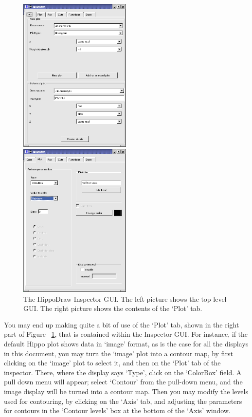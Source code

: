 \documentclass[10pt]{article}
\begin{document}
\begin{figure}
  \centering
  \begin{minipage}[c]{0.5\textwidth}
     \centering \includegraphics[width=2.2in]{FiguresAndDiagrams/inspector_top}
  \end{minipage}%
  \begin{minipage}[c]{0.5\textwidth}
     \centering \includegraphics[width=2.2in]{FiguresAndDiagrams/inspector_plot}
  \end{minipage}
  \caption {The HippoDraw Inspector GUI. The left picture shows the top
  level GUI. The right picture shows the contents of the `Plot' tab.}
  \label{fig:Inspector}
\end{figure}

You may end up making quite a bit of use of the `Plot' tab, shown
in the right part of Figure ~\ref{fig:Inspector}, that is contained within
the Inspector GUI. For instance, if the default Hippo plot shows data
in `image' format, as is the case for all the displays in this
document, you may turn the `image' plot into a contour map, by
first clicking on the `image' plot to select it, and then on the `Plot'
tab of the inspector. There, where the display says `Type', click on the 
`ColorBox' field. A pull down menu will appear; select `Contour' from
the pull-down menu, and the image display will be turned into a contour
map. Then you may modify the levels used for contouring, by clicking
on the `Axis' tab, and adjusting the parameters for contours in the
`Contour levels' box at the bottom of the `Axis' window.
\end{document}
